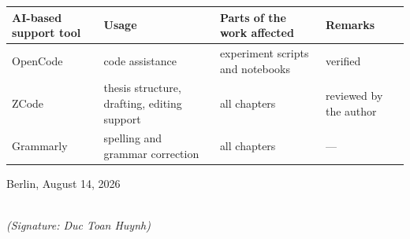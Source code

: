 {\vspace{0.15cm}

\noindent
{\footnotesize
\begin{tabularx}{\linewidth}{@{}p{2.8cm}p{4.4cm}p{4.6cm}X@{}}
\toprule
AI-based support tool & Usage & Parts of the work affected & Remarks \\
\midrule
OpenCode & code assistance & experiment scripts and notebooks & verified \\
ZCode & thesis structure, drafting, editing support & all chapters & reviewed by the author \\
Grammarly & spelling and grammar correction & all chapters & --- \\
\bottomrule
\end{tabularx}
}

\vspace{0.3cm}

\noindent
Berlin, August 14, 2026

\vspace{0.4cm}

\hspace*{7cm}%
\dotfill\\
\hspace*{8.5cm}%
\textit{(Signature: Duc Toan Huynh)}

}

